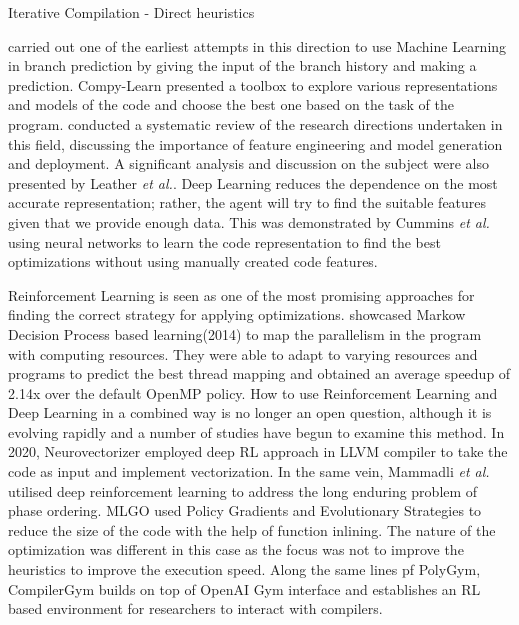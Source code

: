 \documentclass[logo,msc]{infthesis}           %
\begin{document}
Iterative Compilation - 
Direct heuristics

\cite{inproceedingsml} carried out one of the earliest attempts in this direction to use Machine Learning in branch prediction by giving the input of the branch history and making a prediction. Compy-Learn\cite{9232946} presented a toolbox to explore various representations and models of the code and choose the best one based on the task of the program. \cite{8357388} conducted a systematic review of the research directions undertaken in this field, discussing the importance of feature engineering and model generation and deployment. A significant analysis and discussion on the subject were also presented by Leather \textit{et al.}\cite{9232934}. Deep Learning reduces the dependence on the most accurate representation; rather, the agent will try to find the suitable features given that we provide enough data. This was demonstrated by Cummins \textit{et al.}\cite{inproceedingsdl} using neural networks to learn the code representation to find the best optimizations without using manually created code features.

Reinforcement Learning is seen as one of the most promising approaches for finding the correct strategy for applying optimizations\cite{9232934}. \cite{10.1007} showcased Markow Decision Process based learning(2014) to map the parallelism in the program with computing resources. They were able to adapt to varying resources and programs to predict the best thread mapping and obtained an average speedup of 2.14x over the default OpenMP policy. How to use Reinforcement Learning and Deep Learning in a combined way is no longer an open question, although it is evolving rapidly and a number of studies have begun to examine this method. In 2020, Neurovectorizer \cite{NeuroVectorizer} employed deep RL approach in LLVM compiler to take the code as input and implement vectorization. In the same vein,  Mammadli \textit{et al.} 
utilised deep reinforcement learning to address the long enduring problem of phase ordering. MLGO \cite{10.48550} used Policy Gradients and Evolutionary Strategies to reduce the size of the code with the help of function inlining. The nature of the optimization was different in this case as the focus was not to improve the heuristics to improve the execution speed.  Along the same lines pf PolyGym, CompilerGym \cite{CompilerGym} builds on top of OpenAI Gym interface and establishes an RL based environment for researchers to interact with compilers.
\end{document}
